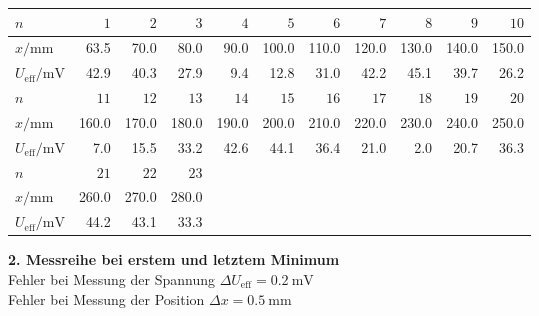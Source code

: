		\begin{center}
			\begin{tabular}{l *{10}{r}}
				\toprule
				$n$ & $1$ & $2$ & $3$ & $4$ & $5$ & $6$ & $7$ & $8$ & $9$ & $10$  \\
				\midrule
				$x/\si{\milli\meter}$ & \num{63.5} & \num{70.0} & \num{80.0} & \num{90.0} & \num{100.0} & \num{110.0} & \num{120.0} & \num{130.0} & \num{140.0} & \num{150.0}  \\
				$U_\text{eff} / \si{\milli\volt}$ & \num{42.9} & \num{40.3} & \num{27.9} & \num{9.4} & \num{12.8} & \num{31.0} & \num{42.2} & \num{45.1} & \num{39.7} & \num{26.2}  \\
				\bottomrule
				\toprule
				$n$ & $11$ & $12$ & $13$ & $14$ & $15$ & $16$ & $17$ & $18$ & $19$ & $20$ \\
				\midrule
				$x/\si{\milli\meter}$ & \num{160.0} & \num{170.0} & \num{180.0} & \num{190.0} & \num{200.0} & \num{210.0} & \num{220.0} & \num{230.0} & \num{240.0} & \num{250.0} \\
				$U_\text{eff} / \si{\milli\volt}$  & \num{7.0} & \num{15.5} & \num{33.2} & \num{42.6} & \num{44.1} & \num{36.4} & \num{21.0} & \num{2.0} & \num{20.7} & \num{36.3}  \\
				\bottomrule
				\toprule
				$n$ & $21$ & $22$ & $23$ & &&&&&& \\
				\midrule
				$x/\si{\milli\meter}$ & \num{260.0} & \num{270.0} & \num{280.0} & &&&&&& \\
				$U_\text{eff} / \si{\milli\volt}$ & \num{44.2} & \num{43.1} & \num{33.3} & &&&&&& \\
				\bottomrule 
			\end{tabular}
		\end{center}

		\textbf{2. Messreihe bei erstem und letztem Minimum}\\
		Fehler bei Messung der Spannung $\Delta U_\text{eff} = \SI{0.2}{\milli\volt}$ \\
		Fehler bei Messung der Position $\Delta x = \SI{0.5}{\milli\meter}$

